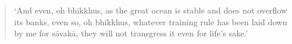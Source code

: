 \clearpage
\thispagestyle{empty}

\mbox{}
\vfill

\begin{quote}
`And even, oh bhikkhus, as the great ocean
is stable and does not overflow its banks,
even so, oh bhikkhus, whatever training
rule has been laid down by me for sāvakā,
they will not transgress it even for life's
sake.'
\end{quote}


\vfill
\mbox{}

